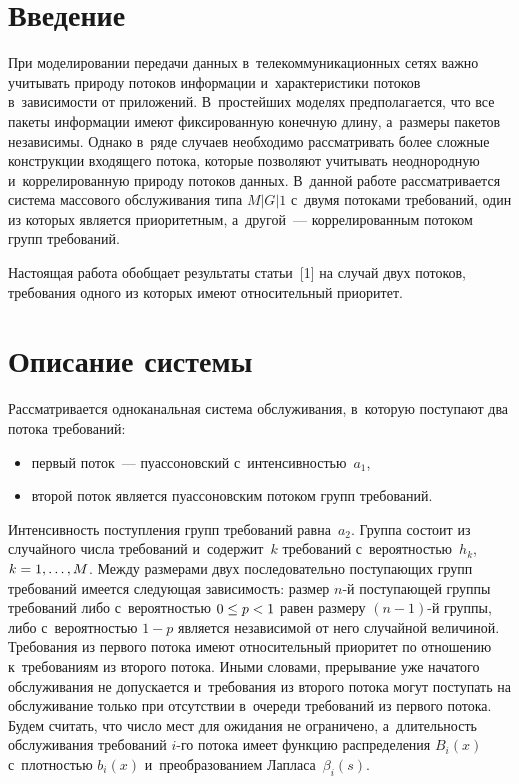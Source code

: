 
  


\thispagestyle{headings}

\begin{multicols}{2}

\label{st\stat}

\section{Введение}

При моделировании передачи данных в~телекоммуникационных сетях важно учитывать 
природу потоков информации и~характеристики потоков в~зависимости от приложений. 
В~простейших моделях предполагается, что все пакеты информации имеют фиксированную 
конечную длину, а~размеры пакетов независимы. Однако в~ряде случаев необходимо 
рассматривать более сложные конструкции входящего потока, которые позволяют 
учитывать неоднородную и~коррелированную природу потоков данных. 
В~данной работе рассматривается сис\-те\-ма массового обслуживания типа $M|G|1$ 
с~двумя потоками требований, один из которых является приоритетным, 
а~другой~--- коррелированным потоком групп требований.

Настоящая работа обобщает результаты \mbox{статьи}~[1] на случай двух потоков, 
требования одного из которых имеют относительный приоритет.

\vspace*{-9pt}

\section{Описание системы}

Рассматривается одноканальная система обслуживания, в~которую поступают 
два потока требований: 
\begin{itemize}
\item первый поток~--- пуассоновский с~интенсив\-ностью~$a_1$, 
\item второй поток является пуассоновским потоком групп требований.
\end{itemize}
Интенсивность 
поступления групп требований равна~$a_2$. Группа состоит из случайного числа 
требований и~содержит~$k$ требований с~вероятностью~$h_k$, $k\hm=1,\ldots,M$. 
Между размерами двух последо\-ва\-тельно по\-сту\-па\-ющих групп требований имеется 
следующая зависимость: размер $n$-й по\-сту\-па\-ющей группы требований либо 
с~ве\-ро\-ят\-ностью $0\hm\leq p\hm<1$ равен размеру $(n-1)$-й группы, либо 
с~ве\-ро\-ят\-ностью $1-p$ является независимой от него случайной величиной. Требования 
из первого потока имеют относительный приоритет по отношению к~требованиям из 
второго потока. Иными словами, прерывание уже начатого обслуживания не допускается 
и~требования из второго потока могут поступать на обслуживание только при отсутствии 
в~очереди требований из первого по\-тока. 
%
Будем считать, что число мест для ожидания 
не ограничено, а~длительность обслуживания требований $i$-го потока имеет функцию 
распределения $B_i(x)$ с~плотностью $b_i(x)$ и~преобразованием Лапласа~$\beta_i(s)$.


\end{multicols}
